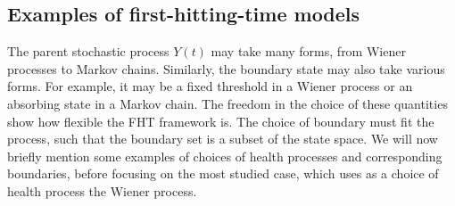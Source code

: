 \subsection{Examples of first-hitting-time models}
The parent stochastic process $Y(t)$ may take many forms, from Wiener processes to Markov chains.
Similarly, the boundary state may also take various forms.
For example, it may be a fixed threshold in a Wiener process or an absorbing state in a Markov chain.
The freedom in the choice of these quantities show how flexible the FHT framework is.
The choice of boundary must fit the process, such that the boundary set is a subset of the state space.
We will now briefly mention some examples of choices of health processes and corresponding boundaries, before focusing on the most studied case, which uses as a choice of health process the Wiener process.
